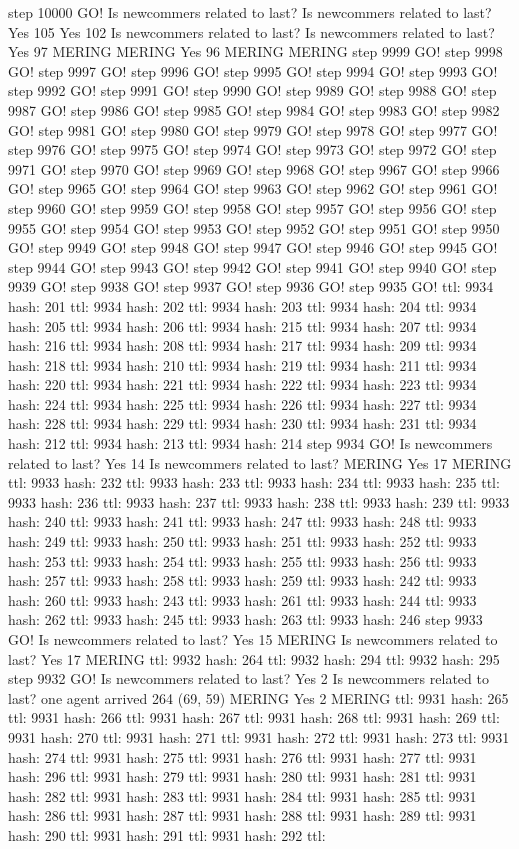 step 10000 GO! Is newcommers related to last? Is newcommers related to last? Yes 105 Yes 102 Is newcommers related to last? Is newcommers related to last? Yes 97 MERING MERING Yes 96 MERING MERING step 9999 GO! step 9998 GO! step 9997 GO! step 9996 GO! step 9995 GO! step 9994 GO! step 9993 GO! step 9992 GO! step 9991 GO! step 9990 GO! step 9989 GO! step 9988 GO! step 9987 GO! step 9986 GO! step 9985 GO! step 9984 GO! step 9983 GO! step 9982 GO! step 9981 GO! step 9980 GO! step 9979 GO! step 9978 GO! step 9977 GO! step 9976 GO! step 9975 GO! step 9974 GO! step 9973 GO! step 9972 GO! step 9971 GO! step 9970 GO! step 9969 GO! step 9968 GO! step 9967 GO! step 9966 GO! step 9965 GO! step 9964 GO! step 9963 GO! step 9962 GO! step 9961 GO! step 9960 GO! step 9959 GO! step 9958 GO! step 9957 GO! step 9956 GO! step 9955 GO! step 9954 GO! step 9953 GO! step 9952 GO! step 9951 GO! step 9950 GO! step 9949 GO! step 9948 GO! step 9947 GO! step 9946 GO! step 9945 GO! step 9944 GO! step 9943 GO! step 9942 GO! step 9941 GO! step 9940 GO! step 9939 GO! step 9938 GO! step 9937 GO! step 9936 GO! step 9935 GO! ttl: 9934 hash: 201 ttl: 9934 hash: 202 ttl: 9934 hash: 203 ttl: 9934 hash: 204 ttl: 9934 hash: 205 ttl: 9934 hash: 206 ttl: 9934 hash: 215 ttl: 9934 hash: 207 ttl: 9934 hash: 216 ttl: 9934 hash: 208 ttl: 9934 hash: 217 ttl: 9934 hash: 209 ttl: 9934 hash: 218 ttl: 9934 hash: 210 ttl: 9934 hash: 219 ttl: 9934 hash: 211 ttl: 9934 hash: 220 ttl: 9934 hash: 221 ttl: 9934 hash: 222 ttl: 9934 hash: 223 ttl: 9934 hash: 224 ttl: 9934 hash: 225 ttl: 9934 hash: 226 ttl: 9934 hash: 227 ttl: 9934 hash: 228 ttl: 9934 hash: 229 ttl: 9934 hash: 230 ttl: 9934 hash: 231 ttl: 9934 hash: 212 ttl: 9934 hash: 213 ttl: 9934 hash: 214 step 9934 GO! Is newcommers related to last? Yes 14 Is newcommers related to last? MERING Yes 17 MERING ttl: 9933 hash: 232 ttl: 9933 hash: 233 ttl: 9933 hash: 234 ttl: 9933 hash: 235 ttl: 9933 hash: 236 ttl: 9933 hash: 237 ttl: 9933 hash: 238 ttl: 9933 hash: 239 ttl: 9933 hash: 240 ttl: 9933 hash: 241 ttl: 9933 hash: 247 ttl: 9933 hash: 248 ttl: 9933 hash: 249 ttl: 9933 hash: 250 ttl: 9933 hash: 251 ttl: 9933 hash: 252 ttl: 9933 hash: 253 ttl: 9933 hash: 254 ttl: 9933 hash: 255 ttl: 9933 hash: 256 ttl: 9933 hash: 257 ttl: 9933 hash: 258 ttl: 9933 hash: 259 ttl: 9933 hash: 242 ttl: 9933 hash: 260 ttl: 9933 hash: 243 ttl: 9933 hash: 261 ttl: 9933 hash: 244 ttl: 9933 hash: 262 ttl: 9933 hash: 245 ttl: 9933 hash: 263 ttl: 9933 hash: 246 step 9933 GO! Is newcommers related to last? Yes 15 MERING Is newcommers related to last? Yes 17 MERING ttl: 9932 hash: 264 ttl: 9932 hash: 294 ttl: 9932 hash: 295 step 9932 GO! Is newcommers related to last? Yes 2 Is newcommers related to last? one agent arrived 264 (69, 59) MERING Yes 2 MERING ttl: 9931 hash: 265 ttl: 9931 hash: 266 ttl: 9931 hash: 267 ttl: 9931 hash: 268 ttl: 9931 hash: 269 ttl: 9931 hash: 270 ttl: 9931 hash: 271 ttl: 9931 hash: 272 ttl: 9931 hash: 273 ttl: 9931 hash: 274 ttl: 9931 hash: 275 ttl: 9931 hash: 276 ttl: 9931 hash: 277 ttl: 9931 hash: 296 ttl: 9931 hash: 279 ttl: 9931 hash: 280 ttl: 9931 hash: 281 ttl: 9931 hash: 282 ttl: 9931 hash: 283 ttl: 9931 hash: 284 ttl: 9931 hash: 285 ttl: 9931 hash: 286 ttl: 9931 hash: 287 ttl: 9931 hash: 288 ttl: 9931 hash: 289 ttl: 9931 hash: 290 ttl: 9931 hash: 291 ttl: 9931 hash: 292 ttl: 